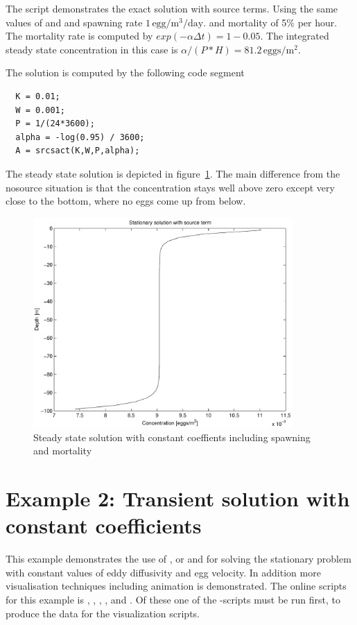 The script  demonstrates the exact solution
 with source terms. Using the same values of
 and  and spawning rate $1 \, \mbox{egg}/\mbox{m}^3/\mbox{day}$.
and mortality of 5\% per hour. The mortality rate  is
computed by $exp(-\alpha \Delta t) = 1 - 0.05$.  The integrated steady
state concentration in this case is $\alpha / ( P * H) = 81.2
\,\mbox{eggs}/\mbox{m}^2$.

The solution is computed by the following code segment
\begin{verbatim}
  K = 0.01;  
  W = 0.001;
  P = 1/(24*3600);   
  alpha = -log(0.95) / 3600;
  A = srcsact(K,W,P,alpha);
\end{verbatim}

The steady state solution  is depicted in figure~\ref{fig:ex1b}.
The main difference from the nosource situation is that
the concentration stays well above zero except very close to the
bottom, where no eggs come up from below.

\begin{figure}
\begin{center}
\includegraphics[height=8cm]{ex1b}
\end{center}
\caption{Steady state solution with constant coeffients including 
        spawning and mortality}\label{fig:ex1b}
\end{figure}


\section{Example 2: Transient solution with constant coefficients}

This example demonstrates the use of ,  or
 and  for solving the stationary problem
with constant values of eddy diffusivity and egg velocity. In addition
more visualisation techniques including animation is demonstrated.
The online scripts for this example is , ,
, ,  and . Of these
one of the -scripts must be run first, to produce the data
for the visualization scripts.

